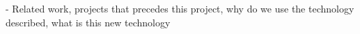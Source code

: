 - Related work, projects that precedes this project, why do we use the technology described, what is this new technology